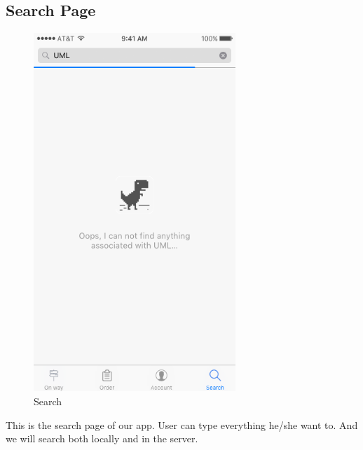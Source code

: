 \documentclass[12pt]{scrreprt}
\begin{document}
\subsection{Search Page}
\begin{figure}[htbp]
  \centering\includegraphics[width=3in]{DocumentRes/Search.png}
  \caption{Search}
\end{figure}
This is the search page of our app. User can type everything he/she want to.
And we will search both locally and in the server.
\end{document}
